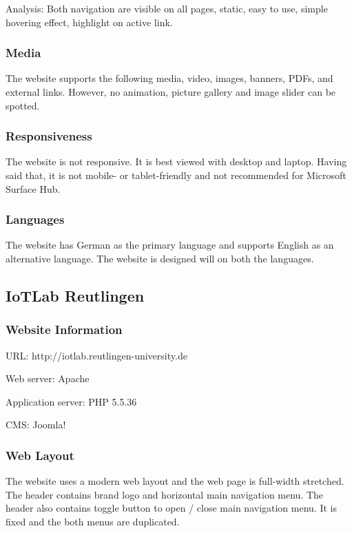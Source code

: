 Analysis: Both navigation are visible on all pages, static, easy to use, simple hovering effect, highlight on active link.

\subsubsection*{Media}
The website supports the following media, video, images, banners, PDFs, and external links. However, no animation, picture gallery and image slider can be spotted.

\subsubsection*{Responsiveness}
The website is not responsive. It is best viewed with desktop and laptop. Having said that, it is not mobile- or tablet-friendly and not recommended for Microsoft Surface Hub.

\subsubsection*{Languages}
The website has German as the primary language and supports English as an alternative language. The website is designed will on both the languages.

\subsection{IoTLab Reutlingen}
\subsubsection*{Website Information}
\begin{itemize*}
\item URL: http://iotlab.reutlingen-university.de
\item Web server: Apache
\item Application server: PHP 5.5.36
\item CMS: Joomla!
\end{itemize*}

\subsubsection*{Web Layout}
The website \cite{Prof.Dr.Ing.habil.Nativi.2016} uses a modern web layout and the web page is full-width stretched. The header contains brand logo and horizontal main navigation menu. The header also contains toggle button to open / close main navigation menu. It is fixed and the both menus are duplicated.

